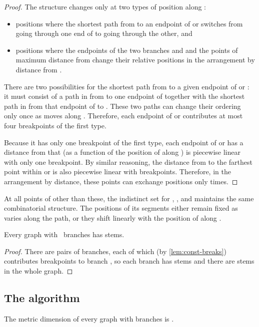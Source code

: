 \documentclass{jgaa-art}
\begin{document}
\begin{proof}
The structure changes only at two types of position along :
\begin{itemize}
\item positions where the shortest path from  to an endpoint of  or  switches from going through one end of  to going through the other, and
\item positions where the endpoints of the two branches  and  and the points of maximum distance from  change their relative positions in the arrangement by distance from .
\end{itemize}
There are two possibilities for the shortest path from  to a given endpoint  of  or : it must consist of a path in  from  to one endpoint of  together with the shortest path in  from that endpoint of  to . These two paths can change their ordering only once as  moves along . Therefore, each endpoint of  or  contributes at most four breakpoints of the first type.

Because it has only one breakpoint of the first type, each endpoint of  or  has a distance from  that (as a function of the position of  along ) is piecewise linear with only one breakpoint. By similar reasoning, the distance from  to the farthest point within  or  is also piecewise linear with  breakpoints. Therefore, in the arrangement by distance, these points can exchange positions only  times.
\end{proof}

At all points of  other than these, the indistinct set for , , and  maintains the same combinatorial structure.  The positions of its segments either remain fixed as  varies along the path, or they shift linearly with the position of  along .

\begin{lemma}
Every graph  with ~branches has  stems.
\end{lemma}

\begin{proof}
There are  pairs of branches, each of which (by \autoref{lem:const-breaks}) contributes  breakpoints to branch , so each branch has  stems and there are  stems in the whole graph.
\end{proof}

\subsection{The algorithm}

\begin{lemma}
\label{lem:locating-set-upper-bound}
The metric dimension of every graph with  branches is .
\end{lemma}
\end{document}
